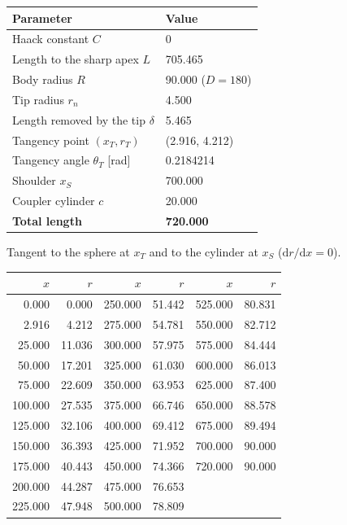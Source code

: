 \documentclass[10pt,a4paper]{article}
\begin{document}
\begin{minipage}[t]{0.44\linewidth}\vspace{0pt}\small
\begin{tabular}{@{}ll@{}}
\toprule
Parameter & Value\\
\midrule
Haack constant $C$ & $0$\\
Length to the sharp apex $L$ & 705.465\\
Body radius $R$ & 90.000 ($D = 180$)\\
Tip radius $r_n$ & 4.500\\
Length removed by the tip $\delta$ & 5.465\\
Tangency point $(x_T, r_T)$ & (2.916, 4.212)\\
Tangency angle $\theta_T$ [rad] & 0.2184214\\
Shoulder $x_S$ & 700.000\\
Coupler cylinder $c$ & 20.000\\
\textbf{Total length} & \textbf{720.000}\\
\bottomrule
\end{tabular}

\smallskip
Tangent to the sphere at $x_T$ and to the cylinder at $x_S$ ($\mathrm{d}r/\mathrm{d}x = 0$).
\end{minipage}\hfill
\begin{minipage}[t]{0.53\linewidth}\vspace{0pt}\scriptsize
\begin{tabular}{@{}rr|rr|rr@{}}
\toprule
$x$ & $r$ & $x$ & $r$ & $x$ & $r$\\
\midrule
0.000 & 0.000 & 250.000 & 51.442 & 525.000 & 80.831 \\
2.916 & 4.212 & 275.000 & 54.781 & 550.000 & 82.712 \\
25.000 & 11.036 & 300.000 & 57.975 & 575.000 & 84.444 \\
50.000 & 17.201 & 325.000 & 61.030 & 600.000 & 86.013 \\
75.000 & 22.609 & 350.000 & 63.953 & 625.000 & 87.400 \\
100.000 & 27.535 & 375.000 & 66.746 & 650.000 & 88.578 \\
125.000 & 32.106 & 400.000 & 69.412 & 675.000 & 89.494 \\
150.000 & 36.393 & 425.000 & 71.952 & 700.000 & 90.000 \\
175.000 & 40.443 & 450.000 & 74.366 & 720.000 & 90.000 \\
200.000 & 44.287 & 475.000 & 76.653 &  &  \\
225.000 & 47.948 & 500.000 & 78.809 &  &  \\
\bottomrule
\end{tabular}
\end{minipage}
\end{document}
